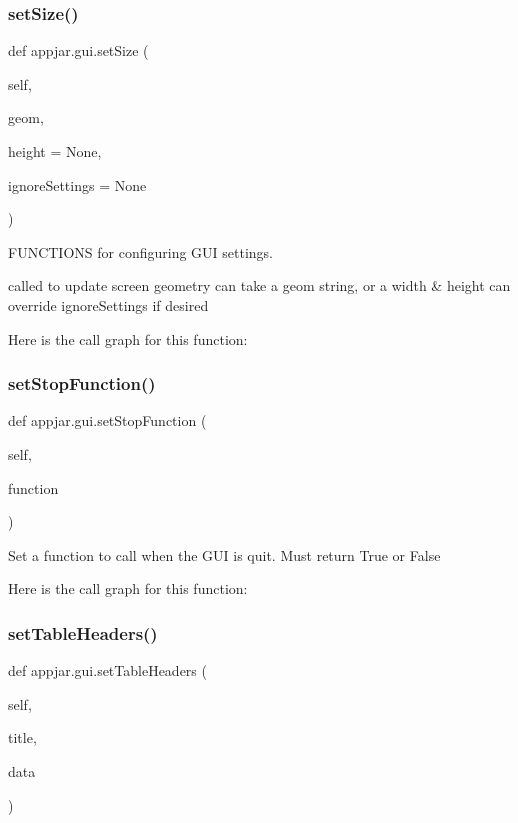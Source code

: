 \begin{DoxyVerb}
\subsubsection{\texorpdfstring{set\+Size()}{setSize()}}
{\footnotesize\ttfamily def appjar.\+gui.\+set\+Size (\begin{DoxyParamCaption}\item[{}]{self,  }\item[{}]{geom,  }\item[{}]{height = {\ttfamily None},  }\item[{}]{ignore\+Settings = {\ttfamily None} }\end{DoxyParamCaption})}



F\+U\+N\+C\+T\+I\+O\+NS for configuring G\+UI settings. 

\begin{DoxyVerb}called to update screen geometry
    can take a geom string, or a width & height
    can override ignoreSettings if desired \end{DoxyVerb}
 Here is the call graph for this function\+:
\mbox{\label{classappjar_1_1gui_a0c8b2b61b8520ab0dbd1ae6220715504}} 
\subsubsection{\texorpdfstring{set\+Stop\+Function()}{setStopFunction()}}
{\footnotesize\ttfamily def appjar.\+gui.\+set\+Stop\+Function (\begin{DoxyParamCaption}\item[{}]{self,  }\item[{}]{function }\end{DoxyParamCaption})}

\begin{DoxyVerb}Set a function to call when the GUI is quit. Must return True or False \end{DoxyVerb}
 Here is the call graph for this function\+:
\mbox{\label{classappjar_1_1gui_a73e66e28db57583672fb509b3bb5324b}} 
\subsubsection{\texorpdfstring{set\+Table\+Headers()}{setTableHeaders()}}
{\footnotesize\ttfamily def appjar.\+gui.\+set\+Table\+Headers (\begin{DoxyParamCaption}\item[{}]{self,  }\item[{}]{title,  }\item[{}]{data }\end{DoxyParamCaption})}


\end{DoxyVerb}
